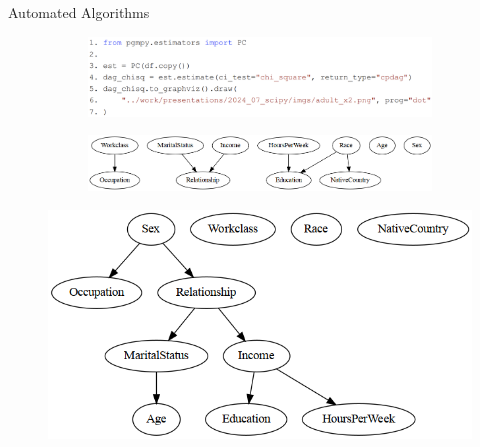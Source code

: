 \documentclass{beamer}
\begin{document}
\begin{frame}{Automated Algorithms}
	\begin{figure}
		\centering
		\begin{subfigure}{0.5\textwidth}
			\includegraphics[scale=0.2]{imgs/pc_x2.png}
		\end{subfigure}%
		\begin{subfigure}{0.5\textwidth}
			\includegraphics[scale=0.25]{imgs/adult_x2.png}
		\end{subfigure}
	\end{figure}
	\begin{figure}
		\centering
		\includegraphics[scale=0.25]{imgs/adult_bic.png}
	\end{figure}
\end{frame}

% 
% 
\end{document}
